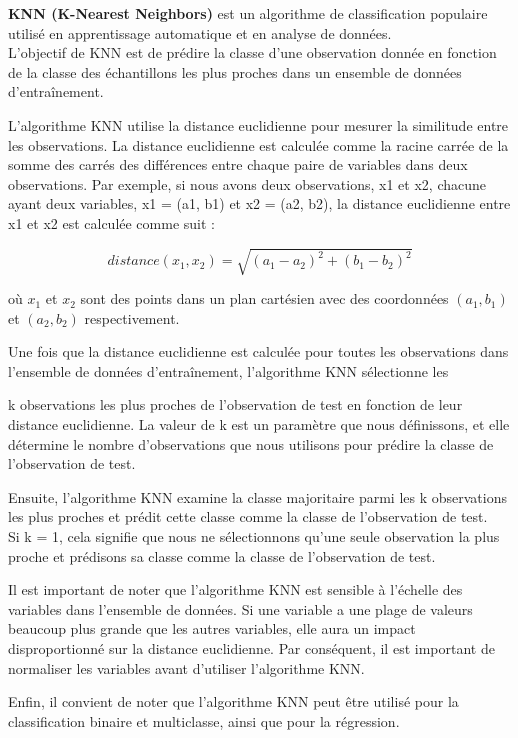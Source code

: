 \textbf{KNN (K-Nearest Neighbors)} est un algorithme de classification populaire utilisé en apprentissage automatique et en analyse de données.\\
L'objectif de KNN est de prédire la classe d'une observation donnée en fonction de la classe des échantillons les plus proches dans un ensemble de données d'entraînement.

L'algorithme KNN utilise la distance euclidienne pour mesurer la similitude entre les observations. La distance euclidienne est calculée comme la racine carrée de 
la somme des carrés des différences entre chaque paire de variables dans deux observations. Par exemple, si nous avons deux observations, x1 et x2, 
chacune ayant deux variables, x1 = (a1, b1) et x2 = (a2, b2), la distance euclidienne entre x1 et x2 est calculée comme suit :

\begin{equation}
distance(x_1, x_2) = \sqrt{(a_1 - a_2)^2 + (b_1 - b_2)^2}
\end{equation}

où $x_1$ et $x_2$ sont des points dans un plan cartésien avec des coordonnées $(a_1, b_1)$ et $(a_2, b_2)$ respectivement.

Une fois que la distance euclidienne est calculée pour toutes les observations dans l'ensemble de données d'entraînement, l'algorithme KNN sélectionne les 

k observations les plus proches de l'observation de test en fonction de leur distance euclidienne. La valeur de k est un paramètre que nous définissons, 
et elle détermine le nombre d'observations que nous utilisons pour prédire la classe de l'observation de test.

Ensuite, l'algorithme KNN examine la classe majoritaire parmi les k observations les plus proches et prédit cette classe comme la classe de l'observation de test.\\
Si k = 1, cela signifie que nous ne sélectionnons qu'une seule observation la plus proche et prédisons sa classe comme la classe de l'observation de test.

Il est important de noter que l'algorithme KNN est sensible à l'échelle des variables dans l'ensemble de données. Si une variable a une plage de valeurs beaucoup plus grande que les autres variables, elle aura un impact disproportionné sur la distance euclidienne. Par conséquent, il est important de normaliser les variables avant d'utiliser l'algorithme KNN.

Enfin, il convient de noter que l'algorithme KNN peut être utilisé pour la classification binaire et multiclasse, ainsi que pour la régression.
